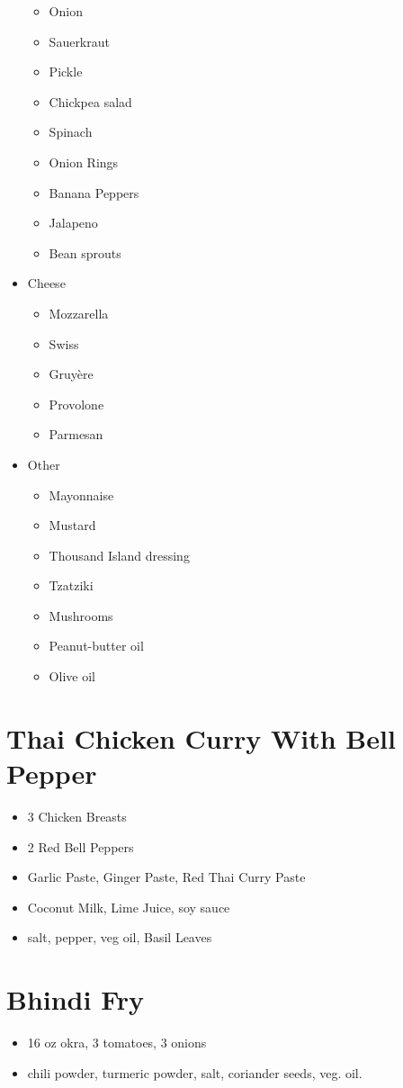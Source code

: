 \documentclass[10pt]{extarticle}
\begin{document}
\begin{itemize}
\begin{itemize}
						\item Onion
						\item Sauerkraut
						\item Pickle
						\item Chickpea salad
						\item Spinach
						\item Onion Rings
						\item Banana Peppers
						\item Jalapeno
						\item Bean sprouts
				\end{itemize}
				\item Cheese
				\begin{itemize}
						\item Mozzarella
						\item Swiss
						\item Gruyère
						\item Provolone
						\item Parmesan
				\end{itemize}
				\item Other
				\begin{itemize}
						\item Mayonnaise 
						\item Mustard
						\item Thousand Island dressing
						\item Tzatziki
						\item Mushrooms
						\item Peanut-butter oil		
						\item Olive oil										
				\end{itemize}
		\end{itemize}

		\section{Thai Chicken Curry With Bell Pepper}
		\begin{itemize}
				\item 3 Chicken Breasts
				\item 2 Red Bell Peppers
				\item Garlic Paste, Ginger Paste, Red Thai Curry Paste
				\item Coconut Milk, Lime Juice, soy sauce
				\item salt, pepper, veg oil, Basil Leaves
		\end{itemize}
		\section{Bhindi Fry}
		\begin{itemize}
			\item 16 oz okra, 3 tomatoes, 3 onions
			\item chili powder, turmeric powder, salt, coriander seeds, veg. oil. 
		\end{itemize}
\end{document}
